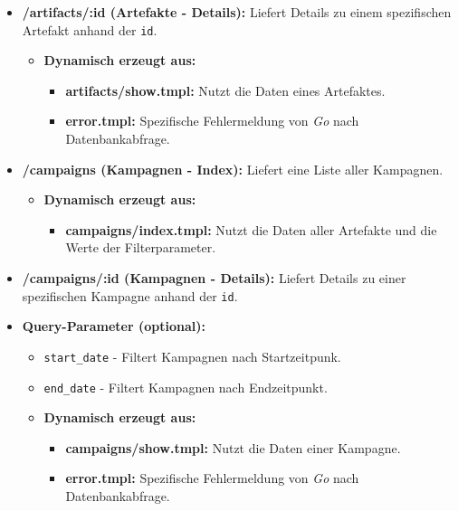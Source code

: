 \begin{itemize}
    \item \textbf{/artifacts/:id (Artefakte - Details):} Liefert Details zu einem spezifischen Artefakt anhand der \texttt{id}.
    \begin{itemize}
        \item \textbf{Dynamisch erzeugt aus:} 
        \begin{itemize}
            \item \textbf{artifacts/show.tmpl:} Nutzt die Daten eines Artefaktes.
            \item \textbf{error.tmpl:} Spezifische Fehlermeldung von \textit{Go} nach Datenbankabfrage.
        \end{itemize}

    \end{itemize}
    
    \item \textbf{/campaigns (Kampagnen - Index):} Liefert eine Liste aller Kampagnen.
    \begin{itemize}
        \item \textbf{Dynamisch erzeugt aus:}
        \begin{itemize}
            \item \textbf{campaigns/index.tmpl:} Nutzt die Daten aller Artefakte und die Werte der Filterparameter.
        \end{itemize}
    \end{itemize}
    
    \item \textbf{/campaigns/:id (Kampagnen - Details):} Liefert Details zu einer spezifischen Kampagne anhand der \texttt{id}.
    \item \textbf{Query-Parameter (optional):}
        \begin{itemize}
            \item \texttt{start\_date} - Filtert Kampagnen nach Startzeitpunk.
            \item \texttt{end\_date} - Filtert Kampagnen nach Endzeitpunkt.
        \end{itemize}
    \begin{itemize}
        \item \textbf{Dynamisch erzeugt aus:}
        \begin{itemize}
            \item \textbf{campaigns/show.tmpl:} Nutzt die Daten einer Kampagne.
            \item \textbf{error.tmpl:} Spezifische Fehlermeldung von \textit{Go} nach Datenbankabfrage.
        \end{itemize}
    \end{itemize}
\end{itemize}

